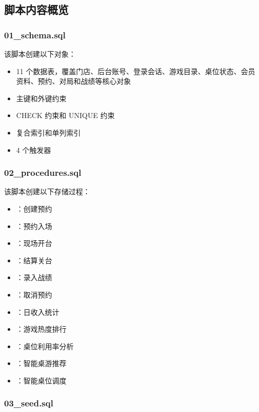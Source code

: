 \subsection{脚本内容概览}

\subsubsection{01\_schema.sql}

该脚本创建以下对象：

\begin{itemize}
  \item 11 个数据表，覆盖门店、后台账号、登录会话、游戏目录、桌位状态、会员资料、预约、对局和战绩等核心对象
  \item 主键和外键约束
  \item CHECK 约束和 UNIQUE 约束
  \item 复合索引和单列索引
  \item 4 个触发器
\end{itemize}

\subsubsection{02\_procedures.sql}

该脚本创建以下存储过程：

\begin{itemize}
  \item {}：创建预约
  \item {}：预约入场
  \item {}：现场开台
  \item {}：结算关台
  \item {}：录入战绩
  \item {}：取消预约
  \item {}：日收入统计
  \item {}：游戏热度排行
  \item {}：桌位利用率分析
  \item {}：智能桌游推荐
  \item {}：智能桌位调度
\end{itemize}

\subsubsection{03\_seed.sql}

